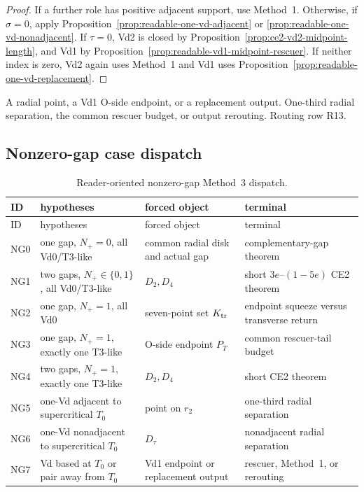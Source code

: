 \begin{proof}
If a further role has positive adjacent support, use Method~1.  Otherwise,
if $\sigma=0$, apply Proposition~\ref{prop:readable-one-vd-adjacent} or
\ref{prop:readable-one-vd-nonadjacent}.  If $\tau=0$, Vd2 is closed by
Proposition~\ref{prop:ce2-vd2-midpoint-length}, and Vd1 by
Proposition~\ref{prop:readable-vd1-midpoint-rescuer}.  If neither index is
zero, Vd2 again uses Method~1 and Vd1 uses
Proposition~\ref{prop:readable-one-vd-replacement}.
\end{proof}

{A radial point, a Vd1 O-side endpoint, or a replacement output.}
{One-third radial separation, the common rescuer budget, or output rerouting.}
{Routing row R13.}

\subsection{Nonzero-gap case dispatch}
\label{subsec:nonzero-gap-dispatch}

\begingroup
\scriptsize
\renewcommand{\arraystretch}{1.08}
\setlength{\tabcolsep}{3pt}
\begin{longtable}{@{}p{}p{}p{}p{}@{}}
\caption{Reader-oriented nonzero-gap Method~3 dispatch.}
\label{tab:readable-finite-dispatch}\\
\toprule
ID&hypotheses&forced object&terminal\\
\midrule
\endfirsthead
\toprule
ID&hypotheses&forced object&terminal\\
\midrule
\endhead
NG0&one gap, $N_+=0$, all Vd0/T3-like&common radial disk and actual gap&complementary-gap theorem\\
NG1&two gaps, $N_+\in\{0,1\}$, all Vd0/T3-like&$D_2,D_4$&short $3e$--$(1-5e)$ CE2 theorem\\
NG2&one gap, $N_+=1$, all Vd0&seven-point set $K_{\rm tr}$&endpoint squeeze versus transverse return\\
NG3&one gap, $N_+=1$, exactly one T3-like&O-side endpoint $P_T$&common rescuer-tail budget\\
NG4&two gaps, $N_+=1$, exactly one T3-like&$D_2,D_4$&short CE2 theorem\\
NG5&one-Vd adjacent to supercritical $T_0$&point on $r_2$&one-third radial separation\\
NG6&one-Vd nonadjacent to supercritical $T_0$&$D_\tau$&nonadjacent radial separation\\
NG7&Vd based at $T_0$ or pair away from $T_0$&Vd1 endpoint or replacement output&rescuer, Method~1, or rerouting\\
\bottomrule
\end{longtable}
\endgroup

